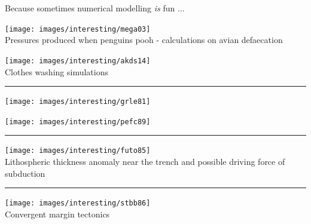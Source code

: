 Because sometimes numerical modelling {\sl is} fun ...

\begin{center}
\begin{minipage}{0.45\textwidth}
\centering
\texttt{[image: images/interesting/mega03]}\\
{\tiny Pressures produced when penguins pooh - calculations on avian defaecation \cite{mega03}}
\end{minipage}\hfill
\begin{minipage}{0.45\textwidth}
\centering
\texttt{[image: images/interesting/akds14]}\\
{\tiny Clothes washing simulations \cite{akds14}}
\end{minipage}
\end{center}

\par\noindent\rule{\textwidth}{0.4pt}

\begin{center}
\begin{minipage}{0.45\textwidth}
\centering
\texttt{[image: images/interesting/grle81]}\\
{\tiny \cite{grle81}}
\end{minipage}\hfill
\begin{minipage}{0.45\textwidth}
\centering
\texttt{[image: images/interesting/pefc89]}\\
{\tiny \cite{pefc89}}
\end{minipage}
\end{center}

\par\noindent\rule{\textwidth}{0.4pt}

\begin{center}
\texttt{[image: images/interesting/futo85]}\\
{\tiny Lithospheric thickness anomaly near the trench and possible driving force of subduction \cite{futo85}}
\end{center}

\par\noindent\rule{\textwidth}{0.4pt}

\begin{center}
\texttt{[image: images/interesting/stbb86]}\\
{\tiny Convergent margin tectonics \cite{stbb86}}
\end{center}


